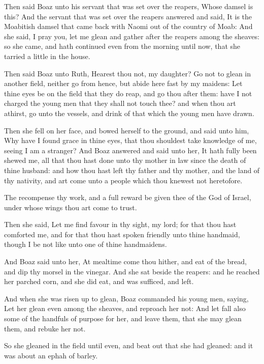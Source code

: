 \verse Then said Boaz unto his servant that was set over the reapers, Whose damsel is this?  \verse And the servant that was set over the reapers answered and said, It is the Moabitish damsel that came back with Naomi out of the country of Moab: \verse And she said, I pray you, let me glean and gather after the reapers among the sheaves: so she came, and hath continued even from the morning until now, that she tarried a little in the house.

\verse Then said Boaz unto Ruth, Hearest thou not, my daughter? Go not to glean in another field, neither go from hence, but abide here fast by my maidens: \verse Let thine eyes be on the field that they do reap, and go thou after them: have I not charged the young men that they shall not touch thee? and when thou art athirst, go unto the vessels, and drink of that which the young men have drawn.

\verse Then she fell on her face, and bowed herself to the ground, and said unto him, Why have I found grace in thine eyes, that thou shouldest take knowledge of me, seeing I am a stranger?  \verse And Boaz answered and said unto her, It hath fully been shewed me, all that thou hast done unto thy mother in law since the death of thine husband: and how thou hast left thy father and thy mother, and the land of thy nativity, and art come unto a people which thou knewest not heretofore.

\verse The \LORD recompense thy work, and a full reward be given thee of the \LORD God of Israel, under whose wings thou art come to trust.

\verse Then she said, Let me find favour in thy sight, my lord; for that thou hast comforted me, and for that thou hast spoken friendly unto thine handmaid, though I be not like unto one of thine handmaidens.

\verse And Boaz said unto her, At mealtime come thou hither, and eat of the bread, and dip thy morsel in the vinegar. And she sat beside the reapers: and he reached her parched corn, and she did eat, and was sufficed, and left.

\verse And when she was risen up to glean, Boaz commanded his young men, saying, Let her glean even among the sheaves, and reproach her not: \verse And let fall also some of the handfuls of purpose for her, and leave them, that she may glean them, and rebuke her not.

\verse So she gleaned in the field until even, and beat out that she had gleaned: and it was about an ephah of barley.

